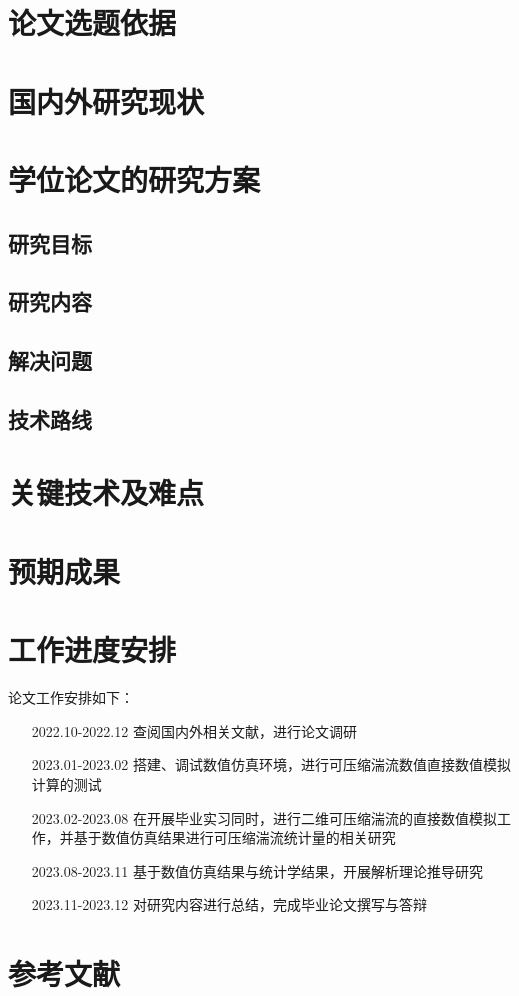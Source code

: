 \documentclass[beginterm]{../package/riaeproposal}
\title{\buaaatthesistitle}
\author{\buaaatauthorname}
\begin{document}
\maketitle

\linespread{1.5}
\pagestyle{frontmatter}
\maketoc 

\section{论文选题依据}
\clearpage
\section{国内外研究现状}
\clearpage
\section{学位论文的研究方案}
\subsection{研究目标}

\subsection{研究内容}
\subsection{解决问题}
\subsection{技术路线}
\clearpage
\section{关键技术及难点}
\clearpage
\section{预期成果}
\clearpage
\section{工作进度安排}
论文工作安排如下：\begin{itemize}[leftmargin=9em]
    \item[2022.10-2022.12] 查阅国内外相关文献，进行论文调研
    \item[2023.01-2023.02] 搭建、调试数值仿真环境，进行可压缩湍流数值直接数值模拟计算的测试
    \item[2023.02-2023.08]  在开展毕业实习同时，进行二维可压缩湍流的直接数值模拟工作，并基于数值仿真结果进行可压缩湍流统计量的相关研究
    \item[2023.08-2023.11]  基于数值仿真结果与统计学结果，开展解析理论推导研究
    \item[2023.11-2023.12] 对研究内容进行总结，完成毕业论文撰写与答辩
\end{itemize}
\clearpage
\section{参考文献}
\vspace{-2em}

\nocite{*}
\end{document}
